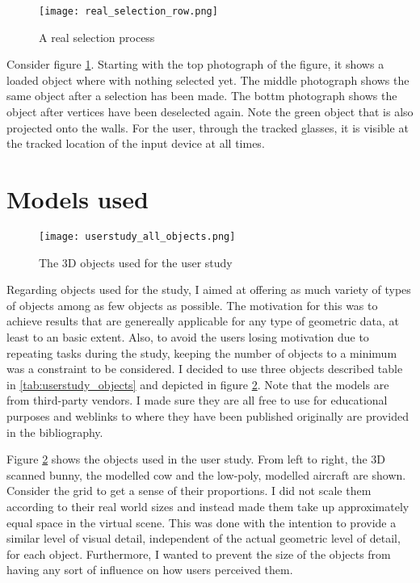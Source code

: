 \begin{figure}[htb]
  \centering
  \texttt{[image: real\_selection\_row.png]}\\ %
  \caption{A real selection process}\label{fig:real_selection}
\end{figure}

Consider figure \ref{fig:real_selection}. Starting with the top photograph of the figure, it shows a loaded object where with nothing selected yet. The middle photograph shows the same object after a selection has been made. The bottm photograph shows the object after vertices have been deselected again. Note the green object that is also projected onto the walls. For the user, through the tracked glasses, it is visible at the tracked location of the input device at all times.

	\section{Models used}
	\label{sec:models_used}
%
%

\begin{figure}[htb]
  \centering
  \texttt{[image: userstudy\_all\_objects.png]}\\ %
  \caption{The 3D objects used for the user study}\label{fig:all_objects}
\end{figure}

Regarding objects used for the study, I aimed at offering as much variety of types of objects among as few objects as possible. The motivation for this was to achieve results that are genereally applicable for any type of geometric data, at least to an basic extent. Also, to avoid the users losing motivation due to repeating tasks during the study, keeping the number of objects to a minimum was a constraint to be considered. I decided to use three objects described table in \ref{tab:userstudy_objects} and depicted in figure \ref{fig:all_objects}. Note that the models are from third-party vendors. I made sure they are all free to use for educational purposes and weblinks to where they have been published originally are provided in the bibliography.

Figure \ref{fig:all_objects} shows the objects used in the user study. From left to right, the 3D scanned bunny, the modelled cow and the low-poly, modelled aircraft are shown. Consider the grid to get a sense of their proportions. I did not scale them according to their real world sizes and instead made them take up approximately equal space in the virtual scene. This was done with the intention to provide a similar level of visual detail, independent of the actual geometric level of detail, for each object. Furthermore, I wanted to prevent the size of the objects from having any sort of influence on how users perceived them.

